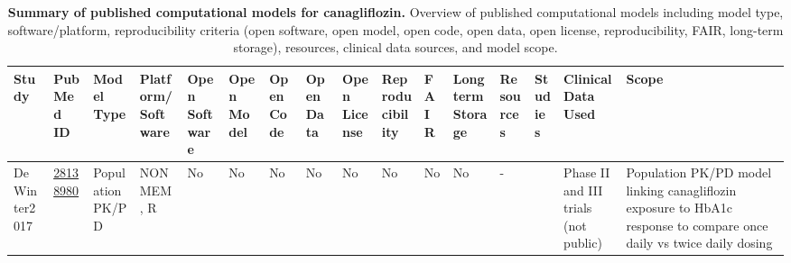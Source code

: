 \begin{landscape}
\begin{table}[H]
\centering
\tabcolsep=3pt
\renewcommand{\arraystretch}{1.3}
\tiny
\begin{threeparttable} 

\caption{\scriptsize{\textbf{Summary of published computational models for canagliflozin.} 
Overview of published computational models including model type, software/platform, 
reproducibility criteria (open software, open model, open code, open data, open license,
reproducibility, FAIR, long-term storage), resources, clinical data sources, and model scope.}}

\begin{tabularx}{\linewidth}{
    >{\raggedright\arraybackslash}p{1.5cm}  %
    >{\centering\arraybackslash}p{0.8cm}    %
    >{\raggedright\arraybackslash}p{1.0cm}  %
    >{\raggedright\arraybackslash}p{1.6cm}  %
    >{\centering\arraybackslash}p{0.8cm}    %
    >{\centering\arraybackslash}p{0.8cm}    %
    >{\centering\arraybackslash}p{0.8cm}    %
    >{\centering\arraybackslash}p{0.8cm}    %
    >{\centering\arraybackslash}p{0.8cm}    %
    >{\centering\arraybackslash}p{0.8cm}    %
    >{\centering\arraybackslash}p{0.8cm}    %
    >{\centering\arraybackslash}p{0.8cm}    %
    >{\centering\arraybackslash}p{2.3cm}    %
    >{\centering\arraybackslash}p{0.7cm}    %
    >{\raggedright\arraybackslash}p{3.0cm}  %
    >{\raggedright\arraybackslash}p{4.3cm}  %
}
\toprule
\textbf{Study} & \textbf{PubMed ID} & \textbf{Model Type} & \textbf{Platform/Software} & \textbf{Open Software} & \textbf{Open Model} & \textbf{Open Code} & \textbf{Open Data} & \textbf{Open License} & \textbf{Reproducibility} & \textbf{FAIR} & \textbf{Longterm Storage} & \textbf{Resources} & \textbf{Studies} & \textbf{Clinical Data Used} & \textbf{Scope} \\
\midrule
DeWinter2017 \cite{DeWinter2017} & \href{https://pubmed.ncbi.nlm.nih.gov/28138980/}{28138980} & Population PK/PD & NONMEM, R & \cellcolor{red!20}No & \cellcolor{red!20}No & \cellcolor{red!20}No & \cellcolor{red!20}No & \cellcolor{red!20}No & \cellcolor{red!20}No & \cellcolor{red!20}No & \cellcolor{red!20}No & - & 3 & Phase II and III trials (not public) & Population PK/PD model linking canagliflozin exposure to HbA1c response to compare once daily vs twice daily dosing \\

\end{tabularx}
\end{threeparttable}
\end{table}
\end{landscape}
